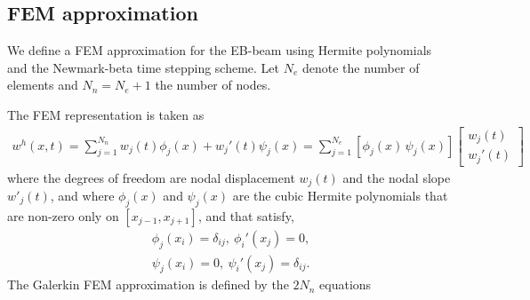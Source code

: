 \documentclass[11pt]{article}
\begin{document}
\newcommand{\Ne}{N_e}%
\newcommand{\Nn}{N_n}%
\newcommand{\dx}{\Delta x}
\newcommand{\Mt}{\tilde{M}}
\newcommand{\Kt}{\tilde{K}}
\newcommand{\Bt}{\tilde{B}}
\newcommand{\Bc}{\mathcal{B}}
\subsection{FEM approximation}\label{sec:BeamModelFEM}

We define a FEM approximation for the EB-beam using Hermite polynomials and the Newmark-beta time stepping scheme.
Let $\Ne$ denote the number of elements and $\Nn=\Ne+1$ the number of nodes. 

The FEM representation is taken as 
\begin{align}
  w^h(x,t) = \sum_{j=1}^{\Nn} w_j(t) \phi_j(x) + w_j'(t) \psi_j(x)  = \sum_{j=1}^{\Ne} [ \phi_j(x)\, \psi_j(x)] \begin{bmatrix} w_j(t)\\w_j'(t)\end{bmatrix}
\end{align}
where the degrees of freedom are nodal displacement $w_j(t)$ and the nodal slope $w'_j(t)$, and where $\phi_j(x)$ and $\psi_j(x)$ are 
the cubic Hermite polynomials 
that are non-zero only on $[x_{j-1},x_{j+1}]$,  and
that satisfy,
\begin{align}
  \phi_j(x_i)=\delta_{ij}, ~ \phi_i'(x_j)=0, \\
  \psi_j(x_i)=0, ~ \psi_i'(x_j)=\delta_{ij}.
\end{align}
% 
The Galerkin FEM approximation is defined by the $2\Nn$ equations
\end{document}
